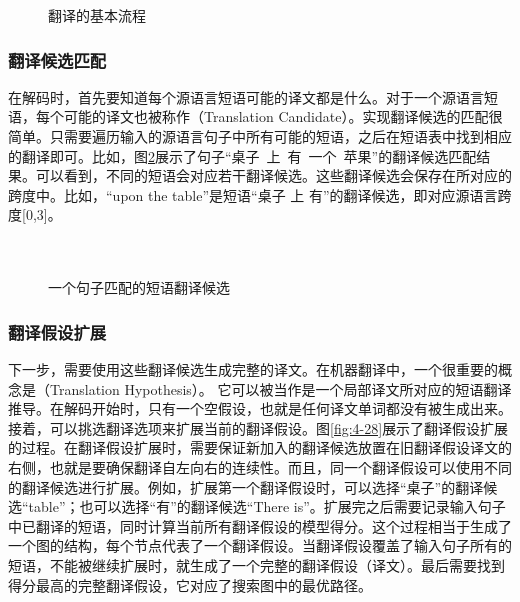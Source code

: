 \begin{figure}[htp]
\centering

\caption{翻译的基本流程}
\label{fig:4-26}
\end{figure}


\subsubsection{翻译候选匹配}

\parinterval 在解码时，首先要知道每个源语言短语可能的译文都是什么。对于一个源语言短语，每个可能的译文也被称作{\small{}}（Translation Candidate）。实现翻译候选的匹配很简单。只需要遍历输入的源语言句子中所有可能的短语，之后在短语表中找到相应的翻译即可。比如，图\ref{fig:4-27}展示了句子``桌子\ 上\ 有\ 一个\ 苹果''的翻译候选匹配结果。可以看到，不同的短语会对应若干翻译候选。这些翻译候选会保存在所对应的跨度中。比如，``upon the table''是短语``桌子 上 有''的翻译候选，即对应源语言跨度[0,3]。\\ \\ \\

\begin{figure}[htp]
\centering

\caption{一个句子匹配的短语翻译候选}
\label{fig:4-27}
\end{figure}


\subsubsection{翻译假设扩展}

\parinterval 下一步，需要使用这些翻译候选生成完整的译文。在机器翻译中，一个很重要的概念是{\small{}}（Translation Hypothesis）。 它可以被当作是一个局部译文所对应的短语翻译推导。在解码开始时，只有一个空假设，也就是任何译文单词都没有被生成出来。接着，可以挑选翻译选项来扩展当前的翻译假设。图\ref{fig:4-28}展示了翻译假设扩展的过程。在翻译假设扩展时，需要保证新加入的翻译候选放置在旧翻译假设译文的右侧，也就是要确保翻译自左向右的连续性。而且，同一个翻译假设可以使用不同的翻译候选进行扩展。例如，扩展第一个翻译假设时，可以选择``桌子''的翻译候选``table''；也可以选择``有''的翻译候选``There is''。扩展完之后需要记录输入句子中已翻译的短语，同时计算当前所有翻译假设的模型得分。这个过程相当于生成了一个图的结构，每个节点代表了一个翻译假设。当翻译假设覆盖了输入句子所有的短语，不能被继续扩展时，就生成了一个完整的翻译假设（译文）。最后需要找到得分最高的完整翻译假设，它对应了搜索图中的最优路径。

